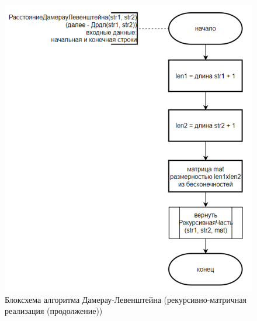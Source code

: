\begin{figure}[H]
    \centering
    \includegraphics[width=1\textwidth]{img/block_2_3_2.png}
    \caption{Блоксхема алгоритма Дамерау-Левенштейна (рекурсивно-матричная реализация (продолжение))}
\end{figure}
\newpage